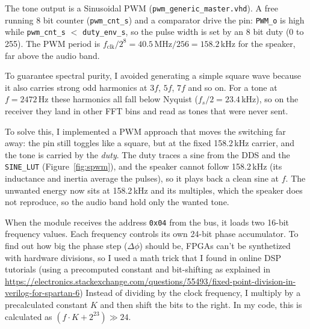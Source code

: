 \documentclass[a4paper,10pt]{article}
\begin{document}
The tone output is a Sinusoidal PWM (\texttt{pwm\_generic\_master.vhd}). A free running 8 bit counter
(\texttt{pwm\_cnt\_s}) and a comparator drive the pin: \texttt{PWM\_o} is high while
\texttt{pwm\_cnt\_s} $<$ \texttt{duty\_env\_s}, so the pulse width is set by an 8 bit duty
(0 to 255). The PWM period is $f_\mathrm{clk}/2^{8} = 40.5\,\mathrm{MHz}/256 = 158.2$\,kHz
for the speaker, far above the
audio band.

To guarantee spectral purity, 
I avoided generating a simple square wave because 
it also carries strong odd harmonics at $3f$, $5f$, $7f$ and so on. 
For a tone at $f=2472$\,Hz these harmonics all fall 
below Nyquist ($f_s/2=23.4$\,kHz), so on the receiver they land in other FFT
bins and read as tones that were never sent.

To solve this, I implemented a PWM approach that moves the switching
 far away: the pin still toggles like a square, but at the fixed 158.2\,kHz 
 carrier, and the tone is carried by the \emph{duty}.
  The duty traces a sine from the DDS and the \texttt{SINE\_LUT} 
  (Figure~\ref{fig:spwm}), and the speaker cannot follow 158.2\,kHz
  (its inductance and inertia average the pulses), so it plays back a 
  clean sine at $f$. The unwanted energy now sits at 158.2\,kHz and its 
  multiples, which the speaker does not reproduce, so the audio band hold
   only the wanted tone.



When the module receives the address \texttt{0x04} from the bus, it loads
 two 16-bit frequency values. Each frequency controls its own 24-bit phase
  accumulator. To find out how big the phase step ($\Delta\phi$) should be, 
  FPGAs can't be synthetized with 
  hardware divisions, so I used a math trick that I found in online
   DSP tutorials (using a precomputed constant and
    bit-shifting as explained in \url{https://electronics.stackexchange.com/questions/55493/fixed-point-division-in-verilog-for-spartan-6})
    \newline
    Instead of dividing by the clock frequency, I multiply by a precalculated 
    constant $K$ and then shift the bits to the right. In my code, this is 
    calculated as $(f\cdot K + 2^{23})\gg24$.
\newline
\end{document}
